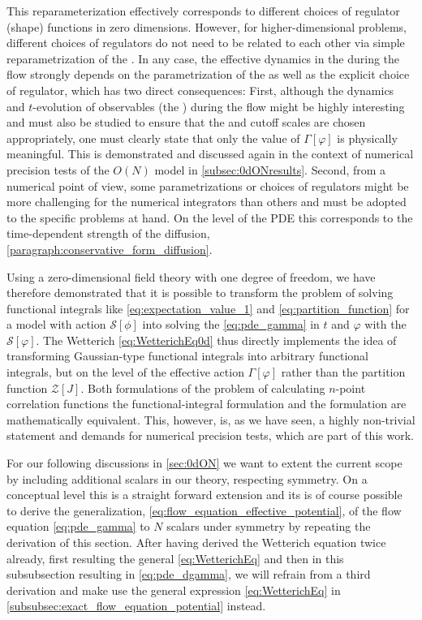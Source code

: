 \begin{enumerate}
	This reparameterization effectively corresponds to different choices of regulator (shape) functions in zero dimensions.
	However, for higher-dimensional problems, different choices of regulators do not need to be related to each other via simple reparametrization of the \rgtime{}.
	In any case, the effective dynamics in the \pde{} during the \frg{} flow strongly depends on the parametrization of the \rgscale{} as well as the explicit choice of regulator, which has two direct consequences:
	First, although the dynamics and $t$-evolution of observables (the \nptFunctions{}) during the \frg{} flow might be highly interesting and must also be studied to ensure that the \uv{} and \ir{} cutoff scales are chosen appropriately, one must clearly state that only the \ir{} value of $\Gamma [ \varphi ]$ is physically meaningful.
	This is demonstrated and discussed again in the context of numerical precision tests of the $O(N)$ model in \cref{subsec:0dONresults}.
	Second, from a numerical point of view, some parametrizations or choices of regulators might be more challenging for the numerical integrators than others and must be adopted to the specific problems at hand.
	On the level of the PDE this corresponds to the time-dependent strength of the diffusion, \cf{} \cref{paragraph:conservative_form_diffusion}.
\end{enumerate}
Using a zero-dimensional field theory with one degree of freedom, we have therefore demonstrated that it is possible to transform the problem of solving functional integrals like \cref{eq:expectation_value_1} and \eqref{eq:partition_function} for a model with action $\mathcal{S}[\phi]$ into solving the \pde{} \eqref{eq:pde_gamma} in $t$ and $\varphi$ with the \ic{} $\mathcal{S} [ \varphi ]$.
The Wetterich \cref{eq:WetterichEq0d} thus directly implements the idea of transforming Gaussian-type functional integrals into arbitrary functional integrals, but on the level of the effective action $\Gamma[\varphi]$ rather than the partition function $\mathcal{Z}[J]$.
Both formulations of the problem of calculating $n$-point correlation functions \dash{} the functional-integral formulation and the \frg{} formulation \dash{} are mathematically equivalent.
This, however, is, as we have seen, a highly non-trivial statement and demands for numerical precision tests, which are part of this work.

For our following discussions in \cref{sec:0dON} we want to extent the current scope by including additional scalars in our theory, respecting \ON{} symmetry.
On a conceptual level this is a straight forward extension and its is of course possible to derive the generalization, \cf{} \eqref{eq:flow_equation_effective_potential}, of the flow equation \eqref{eq:pde_gamma} to $N$ scalars under \ON{} symmetry by repeating the derivation of this section.
After having derived the Wetterich equation twice already, first resulting the general \cref{eq:WetterichEq} and then in this subsubsection resulting in \cref{eq:pde_dgamma}, we will refrain from a third derivation and make use the general expression \eqref{eq:WetterichEq} in \cref{subsubsec:exact_flow_equation_potential} instead.